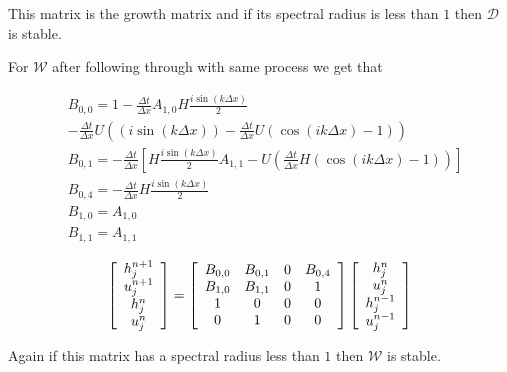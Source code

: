 This matrix is the growth matrix and if its spectral radius is less than $1$ then $\mathcal{D}$ is stable.


For $\mathcal{W}$ after following through with same process we get that

\begin{align*}
&B_{0,0} = 1 - \frac{\Delta t}{\Delta x}A_{1,0}H\frac{i\sin\left(k\Delta x\right)}{2} \\ &- \frac{\Delta t}{\Delta x}U\left(\left(i\sin\left(k\Delta x\right)\right) - \frac{\Delta t}{\Delta x}U\left(\cos\left(ik\Delta x\right) - 1\right)\right) \\
&B_{0,1} = - \frac{\Delta t}{\Delta x} \left[H\frac{i\sin\left(k\Delta x\right)}{2}A_{1,1}   -U\left(\frac{\Delta t}{\Delta x}H\left(\cos\left(ik\Delta x\right) - 1\right)\right) \right] \\
&B_{0,4} = - \frac{\Delta t}{\Delta x}H\frac{i\sin\left(k\Delta x\right)}{2} \\
&B_{1,0} = A_{1,0} \\
&B_{1,1} =A_{1,1}
\end{align*}

\[
\left[\begin{array}{c}
h^{n+1}_j \\
u^{n+1}_j\\
h^n_j \\
u^n_j
\end{array} \right] = \left[\begin{array}{c c c c}
B_{0,0} & B_{0,1} & 0 & B_{0,4} \\
B_{1,0} & B_{1,1}&0 & 1 \\
1&0&0&0\\
0&1&0&0
\end{array} \right]  \left[\begin{array}{c}
h^{n}_j \\
u^{n}_j\\
h^{n-1}_j \\
u^{n-1}_j
\end{array} \right] 
\]

Again if this matrix has a spectral radius less than $1$ then $\mathcal{W}$ is stable.